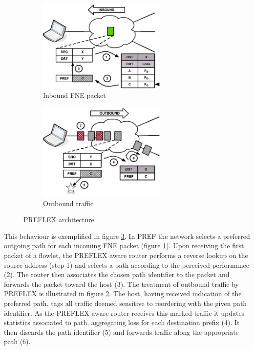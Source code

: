 \begin{figure}
    \begin{subfigure}[b]{0.5\textwidth}
        \centering
        \includegraphics[width=2.5in]{figures/preflex/preflex1}
        \caption{Inbound FNE packet}
        \label{fig:preflexin}
    \end{subfigure}%
    \begin{subfigure}[b]{0.5\textwidth}
        \centering
        \includegraphics[width=2.5in]{figures/preflex/preflex2}
        \caption{Outbound traffic}
        \label{fig:preflexout}
    \end{subfigure}
    \caption{PREFLEX architecture.}
    \label{fig:preflex}
\end{figure}

This behaviour is exemplified in figure \ref{fig:preflex}.  
In \ac{PREF} the network selects a preferred outgoing path for each incoming \ac{FNE} packet (figure \ref{fig:preflexin}). 
Upon receiving the first packet of a flowlet, the \ac{PREFLEX} aware router performs a reverse lookup on the source address (step 1) and selects a path according to the perceived performance (2). 
The router then associates the chosen path identifier to the packet and forwards the packet toward the host (3).
The treatment of outbound traffic by \ac{PREFLEX} is illustrated in figure \ref{fig:preflexout}. 
The host, having received indication of the preferred path, tags all traffic deemed sensitive to reordering with the given path identifier. 
As the \ac{PREFLEX} aware router receives this marked traffic it updates statistics associated to path, aggregating loss for each destination prefix (4). 
It then discards the path identifier (5) and forwards traffic along the appropriate path (6). 

